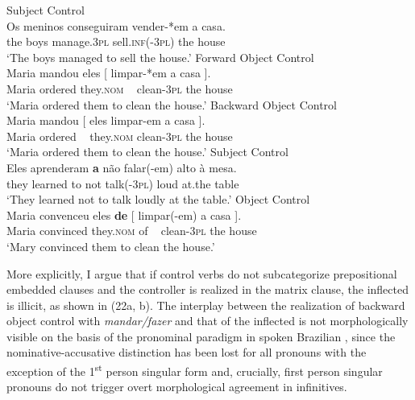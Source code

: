 \documentclass[output=paper]{langsci/langscibook}
\begin{document}
\ea%
    \label{ex:moreno:22}
    \ea  Subject Control\\ 
    \gll Os meninos  conseguiram  vender-*em   a casa.  \\
         the boys  manage.\textsc{3pl}   sell.\textsc{inf}(-\textsc{3pl}) the house\\
    \glt ‘The boys managed to sell the house.’
    \ex  Forward Object Control\\
    \gll Maria mandou   eles    [ limpar-*em a    casa ].    \\
         Maria ordered    they.\textsc{nom}  ~ clean{}-\textsc{3pl}     the house\\
    \glt ‘Maria ordered them  to clean the house.’
    \ex  Backward Object Control\\
    \gll Maria mandou       [ eles limpar-em a        casa ].    \\
         Maria ordered      ~    they.\textsc{nom}   clean{}-\textsc{3pl}     the house\\
    \glt ‘Maria ordered them to clean the house.’
    \z
\z
\ea%
    \label{ex:moreno:23}
    \ea  Subject Control\\
    \gll Eles     aprenderam \textbf{a}  não   falar(-em)  alto  à        mesa.\\
         they    learned         to not    talk({}-\textsc{3pl})    loud at.the table  \\
    \glt ‘They learned not to talk loudly at the table.’
    \ex  Object Control\\
    \gll Maria  convenceu eles          \textbf{de}  [  limpar(-em) a    casa ].     \\
         Maria  convinced they.\textsc{nom} of    ~ clean-\textsc{3pl}     the house\\
    \glt ‘Mary convinced them to clean the house.’
    \z
\z

More explicitly, I argue that if control verbs do not subcategorize prepositional embedded clauses and the controller is realized in the matrix clause, the inflected  is illicit, as shown in (22a, b). The interplay between the realization of backward object control with \textit{mandar\slash fazer} and that of the inflected  is not morphologically visible on the basis of the pronominal paradigm in spoken Brazilian , since the nominative-accusative distinction has been lost for all pronouns with the exception of the 1\textsuperscript{st} person singular form and, crucially, first person singular pronouns do not trigger overt morphological agreement in infinitives. 
\end{document}

